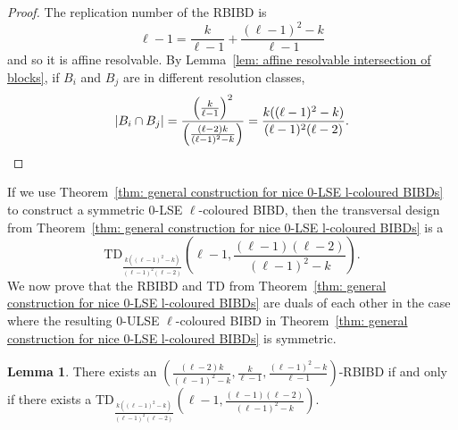 \documentclass[12pt]{article}
\theoremstyle{definition}
\newtheorem{lemma}[theorem]{Lemma}
\begin{document}
\begin{proof}
    The replication number of the RBIBD is \[\ell-1 = \frac{k}{\ell-1} + \frac{(\ell-1)^2 - k}{\ell-1}\] and so it is affine resolvable. By Lemma~\ref{lem: affine resolvable intersection of blocks}, if $B_i$ and $B_j$ are in different resolution classes, \[|B_i \cap B_j| = \frac{\left(\frac{k}{\ell-1}\right)^2}{\left(\frac{(\ell-2)k}{(\ell-1)^2 - k}\right)} = \frac{k((\ell-1)^2 - k)}{(\ell-1)^2(\ell-2)}. \qedhere\]
\end{proof}

If we use Theorem~\ref{thm: general construction for nice 0-LSE l-coloured BIBDs} to construct a symmetric $0$-LSE $\ell$-coloured BIBD, then the transversal design from Theorem~\ref{thm: general construction for nice 0-LSE l-coloured BIBDs} is a \[\text{TD}_{\frac{k((\ell-1)^2 - k)}{(\ell-1)^2(\ell-2)}}\left(\ell-1, \frac{(\ell-1)(\ell-2)}{(\ell-1)^2 - k}\right).\] We now prove that the RBIBD and TD from Theorem~\ref{thm: general construction for nice 0-LSE l-coloured BIBDs} are duals of each other in the case where the resulting $0$-ULSE $\ell$-coloured BIBD in Theorem~\ref{thm: general construction for nice 0-LSE l-coloured BIBDs} is symmetric.

\begin{lemma}\label{lem: ingredients are duals in symmetric case}
    There exists an $\left(\frac{(\ell-2)k}{(\ell-1)^2 - k}, \frac{k}{\ell-1}, \frac{(\ell-1)^2 - k}{\ell-1}\right)$-RBIBD if and only if there exists a TD$_{\frac{k((\ell-1)^2 - k)}{(\ell-1)^2(\ell-2)}}\left(\ell-1, \frac{(\ell-1)(\ell-2)}{(\ell-1)^2 - k}\right)$. 
\end{lemma}
\end{document}
